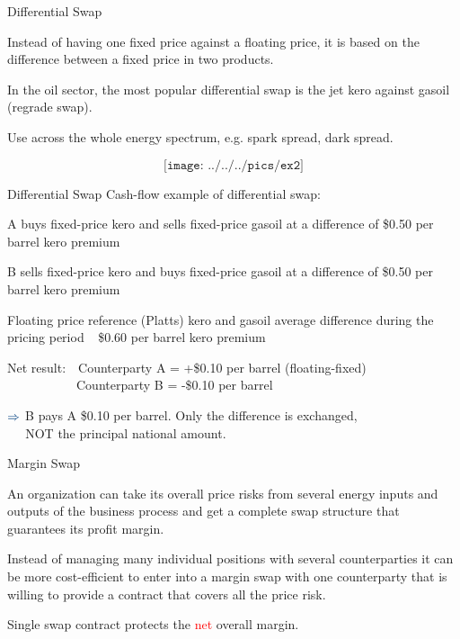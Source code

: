 
{Differential Swap}
  \item<1-> Instead of having one fixed price against a floating price, it is based on the difference between a fixed price in two products.
  \item<2-> In the oil sector, the most popular differential swap is the jet kero against gasoil (regrade swap).
  \item<3-> Use across the whole energy spectrum, e.g. spark spread, dark spread.
\item<4->
$$\texttt{[image: ../../../pics/ex2]}$$

{Differential Swap}
\textcolor[rgb]{0.00,0.25,0.50}{Cash-flow example of differential swap:}
\item<1->
A buys fixed-price kero and sells fixed-price gasoil at a difference of \$0.50 per barrel kero premium
\item<2-> B sells fixed-price kero and buys fixed-price gasoil at a difference of \$0.50 per barrel kero premium
\item<3-> Floating price reference (Platts) kero and gasoil average difference during the pricing period $\;\,$ \$0.60 per barrel kero premium
\item<4->
\textcolor[rgb]{0.00,0.25,0.50}{Net result:}$\quad$Counterparty A = +\$0.10 per barrel (floating-fixed)\\
$\qquad\qquad\quad\,$  Counterparty B = -\$0.10 per barrel
\item<5->
$\textcolor[rgb]{0.00,0.25,0.50}{\Rightarrow}$ B pays A \$0.10 per barrel. Only the difference is exchanged,\\
$\quad\;\,$NOT the principal national amount.


{Margin Swap}
\item<1->
An organization can take its overall price risks from several energy inputs and outputs of the business process and get a complete swap structure that guarantees its profit margin.
\item<2-> Instead of managing many individual positions with several counterparties it can be more cost-efficient to enter into a margin swap with one counterparty that is willing to provide a contract that covers all the price risk.
\item<3-> Single swap contract protects the \textcolor{red}{net} overall margin.

